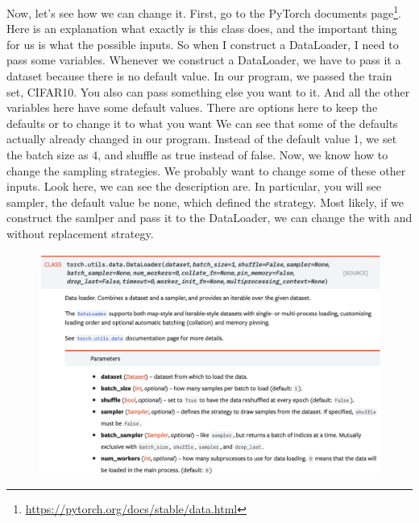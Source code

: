 Now, let's see how we can change it. First, go to the PyTorch documents page\footnote{\url{https://pytorch.org/docs/stable/data.html}}. Here is an explanation what exactly is this class does, and the important thing for us is what the possible inputs. So when I construct a DataLoader, I need to pass some variables. Whenever we construct a DataLoader, we have to pass it a dataset because there is no default value. In our program, we passed the train set, CIFAR10. You also can pass something else you want to it. And all the other variables here have some default values. There are options here to keep the defaults or to change it to what you want We can see that some of the defaults actually already changed in our program. Instead of the default value 1, we set the batch size as 4, and shuffle as true instead of false. Now, we know how to change the sampling strategies. We probably want to change some of these other inputs. Look here, we can see the description are. In particular, you will see sampler, the default value be none, which defined the strategy. Most likely, if we construct the samlper and pass it to the DataLoader, we can change the with and without replacement strategy.
\begin{figure}[H]
\centering
\includegraphics[scale=0.5]{./figures/497Proj_DataLoader}
\end{figure}

